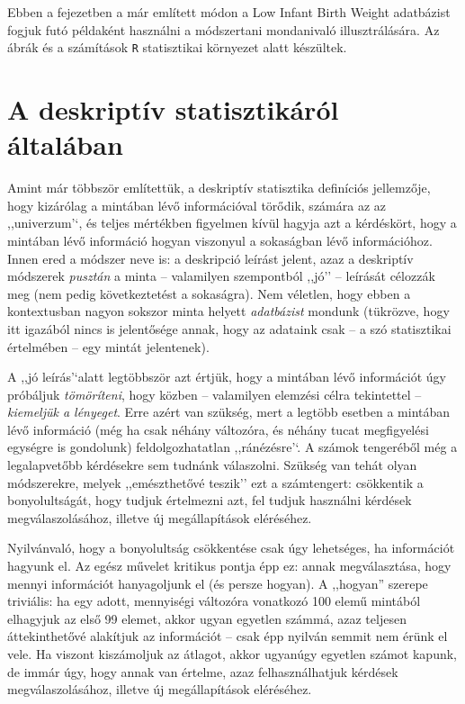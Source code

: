 \documentclass[]{book}
\begin{document}
Ebben a fejezetben a már említett módon a Low Infant Birth Weight
adatbázist fogjuk futó példaként használni a módszertani mondanivaló
illusztrálására. Az ábrák és a számítások \texttt{R} statisztikai
környezet alatt készültek.

\section{A deskriptív statisztikáról
általában}\label{deskriptivaltalaban}

Amint már többször említettük, a deskriptív statisztika definíciós
jellemzője, hogy kizárólag a mintában lévő információval törődik,
számára az az ,,univerzum'`, és teljes mértékben figyelmen kívül hagyja
azt a kérdéskört, hogy a mintában lévő információ hogyan viszonyul a
sokaságban lévő információhoz. Innen ered a módszer neve is: a
deskripció leírást jelent, azaz a deskriptív módszerek \emph{pusztán} a
minta -- valamilyen szempontból ,,jó'' -- leírását célozzák meg (nem
pedig következtetést a sokaságra). Nem véletlen, hogy ebben a
kontextusban nagyon sokszor minta helyett \emph{adatbázist} mondunk
(tükrözve, hogy itt igazából nincs is jelentősége annak, hogy az
adataink csak -- a szó statisztikai értelmében -- egy mintát
jelentenek).

A ,,jó leírás'`alatt legtöbbször azt értjük, hogy a mintában lévő
információt úgy próbáljuk \emph{tömöríteni}, hogy közben -- valamilyen
elemzési célra tekintettel -- \emph{kiemeljük a lényeget}. Erre azért
van szükség, mert a legtöbb esetben a mintában lévő információ (még ha
csak néhány változóra, és néhány tucat megfigyelési egységre is
gondolunk) feldolgozhatatlan ,,ránézésre'`. A számok tengeréből még a
legalapvetőbb kérdésekre sem tudnánk válaszolni. Szükség van tehát olyan
módszerekre, melyek ,,emészthetővé teszik'' ezt a számtengert:
csökkentik a bonyolultságát, hogy tudjuk értelmezni azt, fel tudjuk
használni kérdések megválaszolásához, illetve új megállapítások
eléréséhez.

Nyilvánvaló, hogy a bonyolultság csökkentése csak úgy lehetséges, ha
információt hagyunk el. Az egész művelet kritikus pontja épp ez: annak
megválasztása, hogy mennyi információt hanyagoljunk el (és persze
hogyan). A ,,hogyan'' szerepe triviális: ha egy adott, mennyiségi
változóra vonatkozó 100 elemű mintából elhagyjuk az első 99 elemet,
akkor ugyan egyetlen számmá, azaz teljesen áttekinthetővé alakítjuk az
információt -- csak épp nyilván semmit nem érünk el vele. Ha viszont
kiszámoljuk az átlagot, akkor ugyanúgy egyetlen számot kapunk, de immár
úgy, hogy annak van értelme, azaz felhasználhatjuk kérdések
megválaszolásához, illetve új megállapítások eléréséhez.
\end{document}
